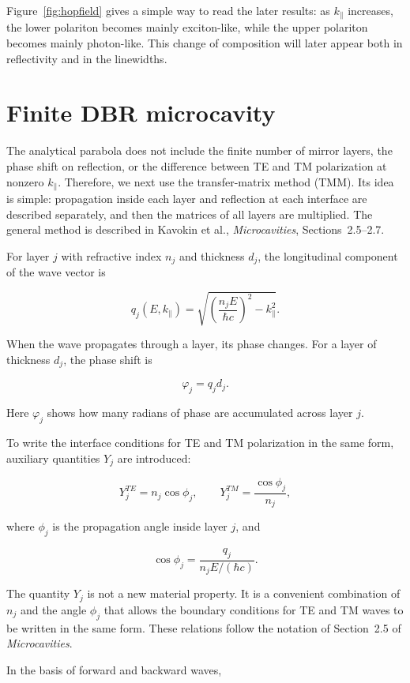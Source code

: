 \documentclass[12pt,a4paper]{article}
\begin{document}
Figure~\ref{fig:hopfield} gives a simple way to read the later results: as $k_\parallel$ increases, the lower polariton becomes mainly exciton-like, while the upper polariton becomes mainly photon-like. This change of composition will later appear both in reflectivity and in the linewidths.

\clearpage
\section{Finite DBR microcavity}

The analytical parabola does not include the finite number of mirror layers, the phase shift on reflection, or the difference between TE and TM polarization at nonzero $k_\parallel$. Therefore, we next use the transfer-matrix method (TMM). Its idea is simple: propagation inside each layer and reflection at each interface are described separately, and then the matrices of all layers are multiplied. The general method is described in Kavokin et al., \textit{Microcavities}, Sections~2.5--2.7.

For layer $j$ with refractive index $n_j$ and thickness $d_j$, the longitudinal component of the wave vector is

\[
q_j(E,k_\parallel)
=
\sqrt{
\left(\frac{n_jE}{\hbar c}\right)^2-k_\parallel^2
}.
\]

When the wave propagates through a layer, its phase changes. For a layer of thickness $d_j$, the phase shift is

\[
\varphi_j=q_jd_j.
\]

Here $\varphi_j$ shows how many radians of phase are accumulated across layer $j$.

To write the interface conditions for TE and TM polarization in the same form, auxiliary quantities $Y_j$ are introduced:

\[
Y_j^{TE}=n_j\cos\phi_j,
\qquad
Y_j^{TM}=\frac{\cos\phi_j}{n_j},
\]

where $\phi_j$ is the propagation angle inside layer $j$, and

\[
\cos\phi_j=
\frac{q_j}{n_jE/(\hbar c)}.
\]

The quantity $Y_j$ is not a new material property. It is a convenient combination of $n_j$ and the angle $\phi_j$ that allows the boundary conditions for TE and TM waves to be written in the same form. These relations follow the notation of Section~2.5 of \textit{Microcavities}.

In the basis of forward and backward waves,
\end{document}
